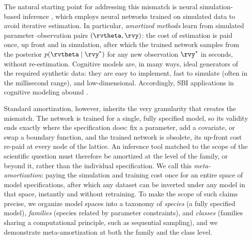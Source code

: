 The natural starting point for addressing this mismatch is neural simulation-based inference \citep[SBI;][]{cranmer2020frontier, deistler2025simulation}, which employs neural networks trained on simulated data to avoid iterative estimation.
In particular, \textit{amortized methods} \citep{burkner2023some} learn from simulated parameter–observation pairs $(\rvtheta, \rvy)$: the cost of estimation is paid once, up front and in simulation, after which the trained network samples from the posterior $p(\rvtheta \mid \rvy^*)$ for any new observation $\rvy^*$ in seconds, without re-estimation.
Cognitive models are, in many ways, ideal generators of the required synthetic data: they are easy to implement, fast to simulate (often in the millisecond range), and low-dimensional.
Accordingly, SBI applications in cognitive modeling abound \citep[e.g.,][]{radev2020amortized, wieschen2020jumping, fengler2021likelihood, boelts2022flexible, von2022mental, ghaderi2023general, sokratous2023ask, schumacher2023superstat, schumacher2024validation, rmus2024artificial, hato2025, schaefer2025conflictModels, scholten2026diffusionLens, kvam2024using, kvam2025comparing, belov2026supervised, wu2026testing}.

Standard amortization, however, inherits the very granularity that creates the mismatch.
The network is trained for a single, fully specified model, so its validity ends exactly where the specification does: fix a parameter, add a covariate, or swap a boundary function, and the trained network is obsolete, its up-front cost re-paid at every node of the lattice.
An inference tool matched to the scope of the scientific question must therefore be amortized at the level of the family, or beyond it, rather than the individual specification.
We call this \textit{meta-amortization}: paying the simulation and training cost once for an entire space of model specifications, after which any dataset can be inverted under any model in that space, instantly and without retraining.
To make the scope of such claims precise, we organize model spaces into a taxonomy of \textit{species} (a fully specified model), \textit{families} (species related by parameter constraints), and \textit{classes} (families sharing a computational principle, such as sequential sampling), and we demonstrate meta-amortization at both the family and the class level.

